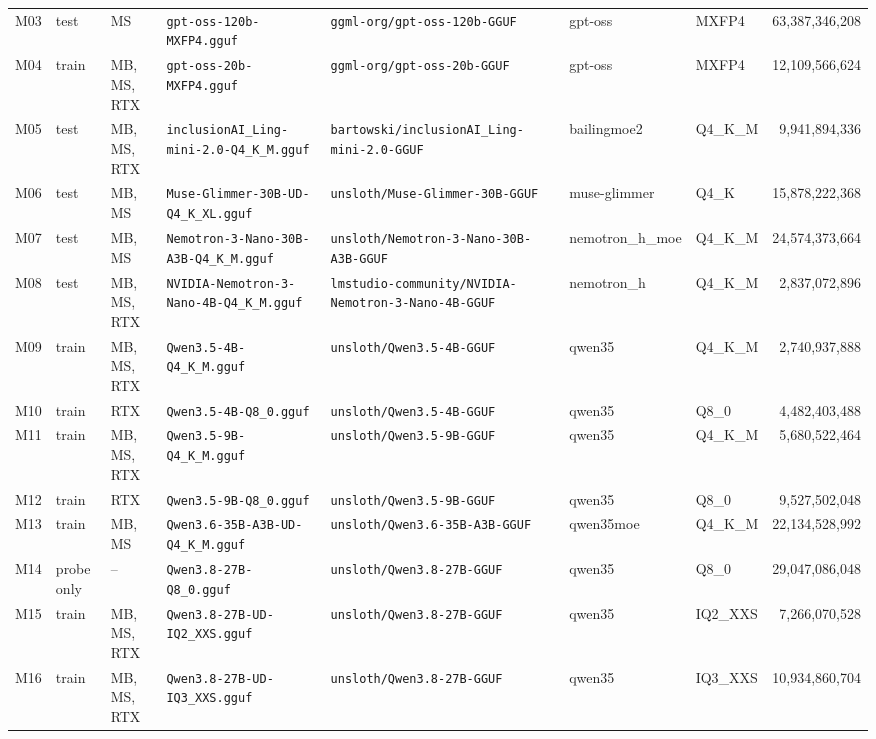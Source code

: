 \documentclass[10pt]{article}
\begin{document}
\begin{landscape}
\begin{longtable}{@{}l l L{0.75in} L{2.7in} L{2.45in} L{0.9in} l r@{}}
M03 & test & MS & \nolinkurl{gpt-oss-120b-MXFP4.gguf} & \nolinkurl{ggml-org/gpt-oss-120b-GGUF} & gpt-oss & MXFP4 & 63,387,346,208 \\
M04 & train & MB, MS, RTX & \nolinkurl{gpt-oss-20b-MXFP4.gguf} & \nolinkurl{ggml-org/gpt-oss-20b-GGUF} & gpt-oss & MXFP4 & 12,109,566,624 \\
M05 & test & MB, MS, RTX & \nolinkurl{inclusionAI_Ling-mini-2.0-Q4_K_M.gguf} & \nolinkurl{bartowski/inclusionAI_Ling-mini-2.0-GGUF} & bailingmoe2 & Q4\_K\_M & 9,941,894,336 \\
M06 & test & MB, MS & \nolinkurl{Muse-Glimmer-30B-UD-Q4_K_XL.gguf} & \nolinkurl{unsloth/Muse-Glimmer-30B-GGUF} & muse-glimmer & Q4\_K & 15,878,222,368 \\
M07 & test & MB, MS & \nolinkurl{Nemotron-3-Nano-30B-A3B-Q4_K_M.gguf} & \nolinkurl{unsloth/Nemotron-3-Nano-30B-A3B-GGUF} & nemotron\_h\_moe & Q4\_K\_M & 24,574,373,664 \\
M08 & test & MB, MS, RTX & \nolinkurl{NVIDIA-Nemotron-3-Nano-4B-Q4_K_M.gguf} & \nolinkurl{lmstudio-community/NVIDIA-Nemotron-3-Nano-4B-GGUF} & nemotron\_h & Q4\_K\_M & 2,837,072,896 \\
M09 & train & MB, MS, RTX & \nolinkurl{Qwen3.5-4B-Q4_K_M.gguf} & \nolinkurl{unsloth/Qwen3.5-4B-GGUF} & qwen35 & Q4\_K\_M & 2,740,937,888 \\
M10 & train & RTX & \nolinkurl{Qwen3.5-4B-Q8_0.gguf} & \nolinkurl{unsloth/Qwen3.5-4B-GGUF} & qwen35 & Q8\_0 & 4,482,403,488 \\
M11 & train & MB, MS, RTX & \nolinkurl{Qwen3.5-9B-Q4_K_M.gguf} & \nolinkurl{unsloth/Qwen3.5-9B-GGUF} & qwen35 & Q4\_K\_M & 5,680,522,464 \\
M12 & train & RTX & \nolinkurl{Qwen3.5-9B-Q8_0.gguf} & \nolinkurl{unsloth/Qwen3.5-9B-GGUF} & qwen35 & Q8\_0 & 9,527,502,048 \\
M13 & train & MB, MS & \nolinkurl{Qwen3.6-35B-A3B-UD-Q4_K_M.gguf} & \nolinkurl{unsloth/Qwen3.6-35B-A3B-GGUF} & qwen35moe & Q4\_K\_M & 22,134,528,992 \\
M14 & probe only & -- & \nolinkurl{Qwen3.8-27B-Q8_0.gguf} & \nolinkurl{unsloth/Qwen3.8-27B-GGUF} & qwen35 & Q8\_0 & 29,047,086,048 \\
M15 & train & MB, MS, RTX & \nolinkurl{Qwen3.8-27B-UD-IQ2_XXS.gguf} & \nolinkurl{unsloth/Qwen3.8-27B-GGUF} & qwen35 & IQ2\_XXS & 7,266,070,528 \\
M16 & train & MB, MS, RTX & \nolinkurl{Qwen3.8-27B-UD-IQ3_XXS.gguf} & \nolinkurl{unsloth/Qwen3.8-27B-GGUF} & qwen35 & IQ3\_XXS & 10,934,860,704 \\

\end{longtable}
\end{landscape}
\end{document}
